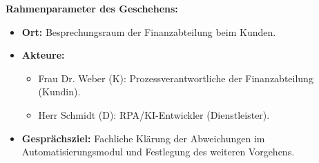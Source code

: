 \textbf{Rahmenparameter des Geschehens:}
\begin{itemize}
    \item \textbf{Ort:} Besprechungsraum der Finanzabteilung beim Kunden.
    \item \textbf{Akteure:} 
    \begin{itemize}
        \item Frau Dr. Weber (K): Prozessverantwortliche der Finanzabteilung (Kundin).
        \item Herr Schmidt (D): \acs{RPA}/\acs{KI}-Entwickler (Dienstleister).
    \end{itemize}
    \item \textbf{Gesprächsziel:} Fachliche Klärung der Abweichungen im Automatisierungsmodul und Festlegung des weiteren Vorgehens.
\end{itemize}

\vspace{0.3cm}

